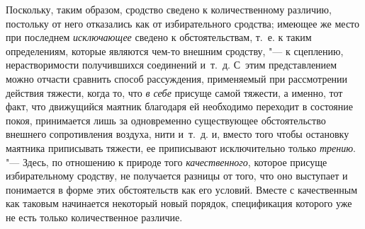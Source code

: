 Поскольку, таким образом, сродство сведено к количественному различию,
постольку от него отказались как от избирательного сродства; имеющее же
место при последнем {\em исключающее} сведено к
обстоятельствам, т.~е. к таким определениям, которые являются чем-то
внешним сродству, "--- к сцеплению, нерастворимости получившихся соединений
и~т.~д. С~этим представлением можно отчасти сравнить способ рассуждения,
применяемый при рассмотрении действия тяжести, когда то, что
{\em в себе} присуще самой тяжести, а именно, тот факт,
что движущийся маятник благодаря ей необходимо переходит в состояние покоя,
принимается лишь за одновременно существующее обстоятельство внешнего
сопротивления воздуха, нити и~т.~д. и, вместо того чтобы остановку маятника
приписывать тяжести, ее приписывают исключительно только
{\em трению}.
"--- Здесь, по отношению к природе того
{\em качественного}, которое присуще избирательному
сродству, не получается разницы от того, что оно выступает и понимается в
форме этих обстоятельств как его условий. Вместе с качественным как таковым
начинается некоторый новый порядок, спецификация которого уже не есть
только количественное различие.


